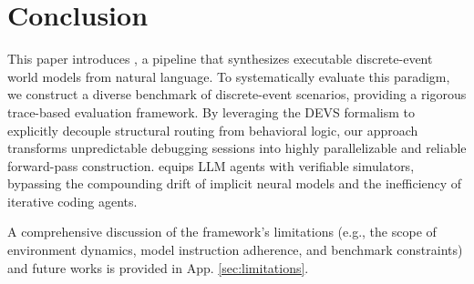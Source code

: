 \section{Conclusion}
\label{sec:conclusion}

This paper introduces \methodname{}, a pipeline that synthesizes executable discrete-event world models from natural language. To systematically evaluate this paradigm, we construct a diverse benchmark of discrete-event scenarios, providing a rigorous trace-based evaluation framework. By leveraging the DEVS formalism to explicitly decouple structural routing from behavioral logic, our approach transforms unpredictable debugging sessions into highly parallelizable and reliable forward-pass construction. \methodname{} equips LLM agents with verifiable simulators, bypassing the compounding drift of implicit neural models and the inefficiency of iterative coding agents.

A comprehensive discussion of the framework's limitations (e.g., the scope of environment dynamics, model instruction adherence, and benchmark constraints) and future works is provided in App. \ref{sec:limitations}.